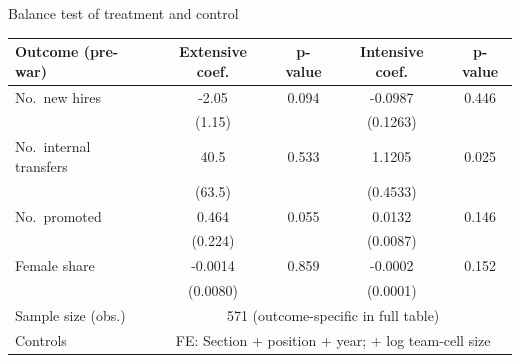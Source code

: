 \begin{frame}[label=balance-test-backup,noframenumbering]{Balance test of treatment and control}
    \centering
    \scriptsize
    \begin{tabular}{lcccc}
        \toprule
        Outcome (pre-war) & Extensive coef. & p-value & Intensive coef. & p-value \\
        \midrule
        No.\ new hires & -2.05 & 0.094 & -0.0987 & 0.446 \\
        & (1.15) &  & (0.1263) &  \\
        No.\ internal transfers & 40.5 & 0.533 & 1.1205 & 0.025 \\
        & (63.5) &  & (0.4533) &  \\
        No.\ promoted & 0.464 & 0.055 & 0.0132 & 0.146 \\
        & (0.224) &  & (0.0087) &  \\
        Female share & -0.0014 & 0.859 & -0.0002 & 0.152 \\
        & (0.0080) &  & (0.0001) &  \\
        \midrule
        Sample size (obs.) & \multicolumn{4}{c}{571 (outcome-specific in full table)} \\
        Controls & \multicolumn{4}{c}{FE: Section + position + year; + log team-cell size} \\
        \bottomrule
    \end{tabular}

    \vspace{0.6em}
    \hyperlink{hierarchy-identification}{}
\end{frame}
